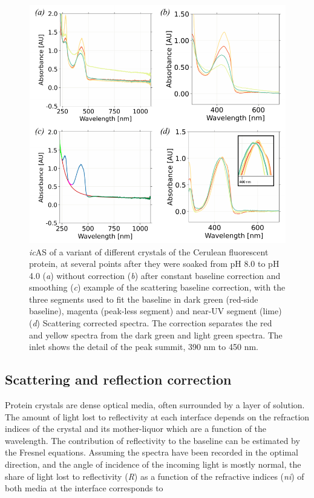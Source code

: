 \begin{figure}[H] %
    \centering
    \noindent \includegraphics[width=\textwidth]{images/Spectroscopy/icOS_toolbox_Fig.3.pdf}
    \hfill
    \caption{\textit{ic}AS of a variant of different crystals of the Cerulean fluorescent protein, at several points after they were soaked from pH 8.0 to pH 4.0 (\textit{a}) without correction (\textit{b}) after constant baseline correction and smoothing (\textit{c}) example of the scattering baseline correction, with the three segments used to fit the baseline in dark green (red-side baseline), magenta (peak-less segment) and near-UV segment (lime) (\textit{d}) Scattering corrected spectra. The correction separates the red and yellow spectra from the dark green and light green spectra. The inlet shows the detail of the peak summit, 390 nm to 450 nm.}
    \label{fig:toolbox_correction}
\end{figure}

\subsection{Scattering and reflection correction}

Protein crystals are dense optical media, often surrounded by a layer of solution. The amount of light lost to reflectivity at each interface depends on the refraction indices of the crystal and its mother-liquor which are a function of the wavelength. The contribution of reflectivity to the baseline can be estimated by the Fresnel equations. Assuming the spectra have been recorded in the optimal direction, and the angle of incidence of the incoming light is mostly normal, the share of light lost to reflectivity (\textit{R}) as a function of the refractive indices (\textit{ni}) of both media at the interface corresponds to 



